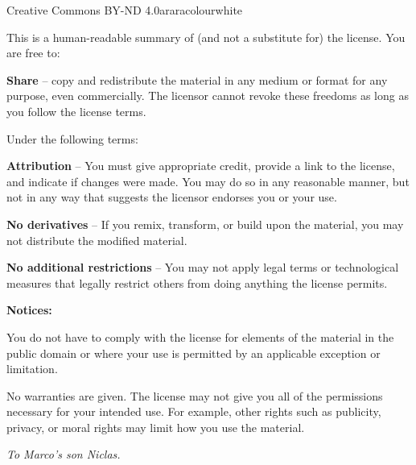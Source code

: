 \documentclass[a4paper,twoside,12pt]{memoir}
\begin{document}
\begin{messagebox}{Creative Commons BY-ND 4.0}{araracolour}{\icinfo}{white}
\setlength{\parskip}{1em}

This is a human-readable summary of (and not a substitute
for) the license. You are free to:

\textbf{Share} -- copy and redistribute the material in any
medium or format for any purpose, even commercially. The
licensor cannot revoke these freedoms as long as you follow
the license terms.

Under the following terms:

\textbf{Attribution} -- You must give appropriate credit,
provide a link to the license, and indicate if changes
were made. You may do so in any reasonable manner, but not
in any way that suggests the licensor endorses you or your
use.

\textbf{No derivatives} -- If you remix, transform, or
build upon the material, you may not distribute the
modified material.

\textbf{No additional restrictions} -- You may not apply
legal terms or technological measures that legally restrict
others from doing anything the license permits.

\textbf{Notices:}

You do not have to comply with the license for elements of
the material in the public domain or where your use is
permitted by an applicable exception or limitation.

No warranties are given. The license may not give you all
of the permissions necessary for your intended use. For
example, other rights such as publicity, privacy, or moral
rights may limit how you use the material.

{\centering\color{araracolour}\scalebox{2.0}{\ccbynd}\par} 
\end{messagebox}

\cleardoublepage

\vspace*{25em}

\begin{flushright}
\em To Marco's son Niclas.
\end{flushright}

\cleardoublepage

\tableofcontents*

\cleardoublepage

\listoffigures*

\cleardoublepage
\end{document}
